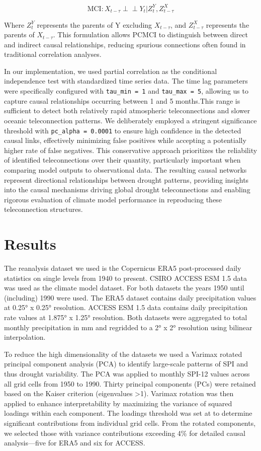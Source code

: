 \documentclass[
]{krantz}
\begin{document}
\[\text{MCI}: X_{t-\tau} \perp\!\!\!\perp Y_t | Z^Y_t, Z^X_{t-\tau}\]

Where \(Z^Y_t\) represents the parents of Y excluding \(X_{t-\tau}\), and \(Z^X_{t-\tau}\) represents the parents of \(X_{t-\tau}\). This formulation allows PCMCI to distinguish between direct and indirect causal relationships, reducing spurious connections often found in traditional correlation analyses.

In our implementation, we used partial correlation as the conditional independence test with standardized time series data. The time lag parameters were specifically configured with \texttt{tau\_min\ =\ 1} and \texttt{tau\_max\ =\ 5}, allowing us to capture causal relationships occurring between 1 and 5 months.This range is sufficient to detect both relatively rapid atmospheric teleconnections and slower oceanic teleconnection patterns. We deliberately employed a stringent significance threshold with \texttt{pc\_alpha\ =\ 0.0001} to ensure high confidence in the detected causal links, effectively minimizing false positives while accepting a potentially higher rate of false negatives. This conservative approach prioritizes the reliability of identified teleconnections over their quantity, particularly important when comparing model outputs to observational data. The resulting causal networks represent directional relationships between drought patterns, providing insights into the causal mechanisms driving global drought teleconnections and enabling rigorous evaluation of climate model performance in reproducing these teleconnection structures.

\section{Results}\label{results-1}

The reanalysis dataset we used is the Copernicus ERA5 post-processed daily statistics on single levels from 1940 to present. CSIRO ACCESS ESM 1.5 data was used as the climate model dataset. For both datasets the years 1950 until (including) 1990 were used. The ERA5 dataset contains daily precipitation values at 0.25° x 0.25° resolution. ACCESS ESM 1.5 data contains daily precipitation rate values at 1.875° x 1.25° resolution. Both datasets were aggregated to total monthly precipitation in mm and regridded to a 2° x 2° resolution using bilinear interpolation.

To reduce the high dimensionality of the datasets we used a Varimax rotated principal component analysis (PCA) to identify large-scale patterns of SPI and thus drought variability. The PCA was applied to monthly SPI-12 values across all grid cells from 1950 to 1990. Thirty principal components (PCs) were retained based on the Kaiser criterion (eigenvalues \textgreater1). Varimax rotation was then applied to enhance interpretability by maximizing the variance of squared loadings within each component. The loadings threshold was set at \textbar{} to determine significant contributions from individual grid cells. From the rotated components, we selected those with variance contributions exceeding 4\% for detailed causal analysis---five for ERA5 and six for ACCESS.
\end{document}
